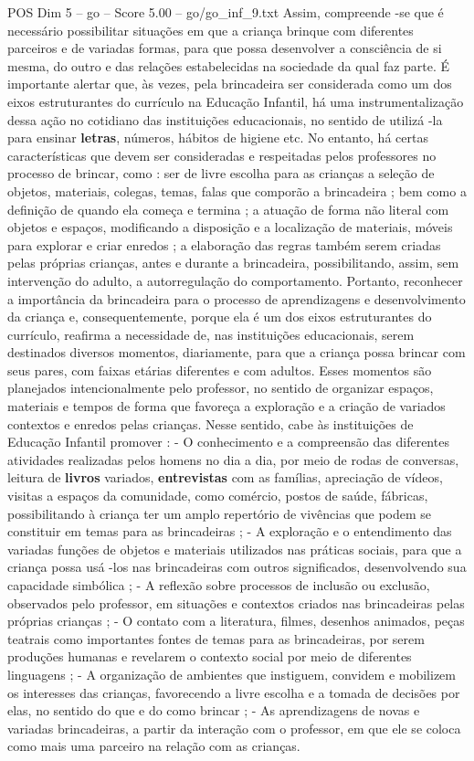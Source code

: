 \begin{textsample}{POS Dim 5 – go – Score 5.00 – go/go\_inf\_9.txt}
Assim, compreende -se que é necessário possibilitar situações em que a criança brinque com diferentes parceiros e de variadas formas, para que possa desenvolver a consciência de si mesma, do outro e das relações estabelecidas na sociedade da qual faz parte.
É importante alertar que, às vezes, pela brincadeira ser considerada como um dos eixos estruturantes do currículo na Educação Infantil, há uma instrumentalização dessa ação no cotidiano das instituições educacionais, no sentido de utilizá -la para ensinar \textbf{letras}, números, hábitos de higiene etc.
No entanto, há certas características que devem ser consideradas e respeitadas pelos professores no processo de brincar, como : ser de livre escolha para as crianças a seleção de objetos, materiais, colegas, temas, falas que comporão a brincadeira ; bem como a definição de quando ela começa e termina ; a atuação de forma não literal com objetos e espaços, modificando a disposição e a localização de materiais, móveis para explorar e criar enredos ; a elaboração das regras também serem criadas pelas próprias crianças, antes e durante a brincadeira, possibilitando, assim, sem intervenção do adulto, a autorregulação do comportamento.
Portanto, reconhecer a importância da brincadeira para o processo de aprendizagens e desenvolvimento da criança e, consequentemente, porque ela é um dos eixos estruturantes do currículo, reafirma a necessidade de, nas instituições educacionais, serem destinados diversos momentos, diariamente, para que a criança possa brincar com seus pares, com faixas etárias diferentes e com adultos.
Esses momentos são planejados intencionalmente pelo professor, no sentido de organizar espaços, materiais e tempos de forma que favoreça a exploração e a criação de variados contextos e enredos pelas crianças.
Nesse sentido, cabe às instituições de Educação Infantil promover : - O conhecimento e a compreensão das diferentes atividades realizadas pelos homens no dia a dia, por meio de rodas de conversas, leitura de \textbf{livros} variados, \textbf{entrevistas} com as famílias, apreciação de vídeos, visitas a espaços da comunidade, como comércio, postos de saúde, fábricas, possibilitando à criança ter um amplo repertório de vivências que podem se constituir em temas para as brincadeiras ; - A exploração e o entendimento das variadas funções de objetos e materiais utilizados nas práticas sociais, para que a criança possa usá -los nas brincadeiras com outros significados, desenvolvendo sua capacidade simbólica ; - A reflexão sobre processos de inclusão ou exclusão, observados pelo professor, em situações e contextos criados nas brincadeiras pelas próprias crianças ; - O contato com a literatura, filmes, desenhos animados, peças teatrais como importantes fontes de temas para as brincadeiras, por serem produções humanas e revelarem o contexto social por meio de diferentes linguagens ; - A organização de ambientes que instiguem, convidem e mobilizem os interesses das crianças, favorecendo a livre escolha e a tomada de decisões por elas, no sentido do que e do como brincar ; - As aprendizagens de novas e variadas brincadeiras, a partir da interação com o professor, em que ele se coloca como mais uma parceiro na relação com as crianças.

\end{textsample}
